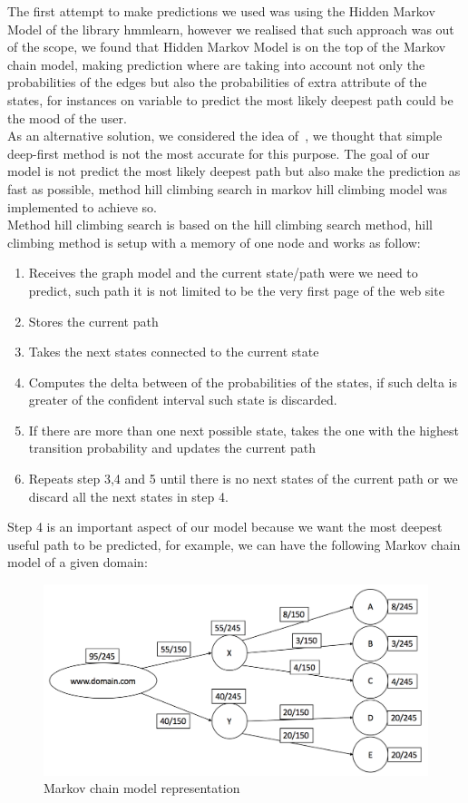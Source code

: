 The first attempt to make predictions we used was using the Hidden Markov Model of the library hmmlearn, however we realised that such approach was out of the scope, we found that Hidden Markov Model is on the top of the Markov chain model, making prediction where are taking into account not only the probabilities of the edges but also the probabilities of extra attribute of the states, for instances on variable to predict the most likely deepest path could be the mood of the user.
\\[2ex]
As an alternative solution, we considered the idea of~\cite{article:markovmodel}, we thought that simple deep-first method is not the most accurate for this purpose. The goal of our model is not predict the most likely deepest path but also make the prediction as fast as possible, method hill climbing search in markov hill climbing model was implemented to achieve so.
\\[2ex]
Method hill climbing search is based  on the hill climbing search method, hill climbing method is setup with a memory of one node and works as follow:

\begin{enumerate}
  \item Receives the graph model and the current state/path were we need to predict, such path it is not limited to be the very first page of the web site
  \item Stores the current path
  \item Takes the next states connected to the current state
  \item Computes the delta between of the probabilities of the states, if such delta is greater of the confident interval such state is discarded.
  \item If there are more than one next possible state, takes the one with the highest transition probability and updates the current path
  \item Repeats step 3,4 and 5 until there is no next states of the current path or we discard all the next states in step 4.
\end{enumerate}

Step 4 is an important aspect of our model because we want the most deepest useful path to be predicted, for example, we can have the following Markov chain model of a given domain:

\begin{figure}[!htp]
    \centering
    \includegraphics[width=\textwidth]{markov_chain}
    \caption{Markov chain model representation}\label{fig:markov_chain}
\end{figure}

